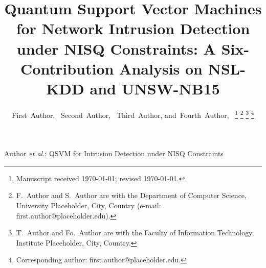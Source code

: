 \documentclass[journal]{IEEEtran}
\begin{document}
  \title{Quantum Support Vector Machines for Network Intrusion
    Detection under NISQ Constraints: A Six-Contribution Analysis
    on NSL-KDD and UNSW-NB15}

  \author{First~Author,~
          Second~Author,~
          Third~Author,
          and~Fourth~Author,~
  \thanks{Manuscript received \today; revised \today.}
  \thanks{F.~Author and S.~Author are with the Department of Computer
    Science, University Placeholder, City, Country (e-mail:
    first.author@placeholder.edu).}
  \thanks{T.~Author and Fo.~Author are with the Faculty of Information
    Technology, Institute Placeholder, City, Country.}
  \thanks{Corresponding author: first.author@placeholder.edu.}}

  {Author \MakeLowercase{\textit{et al.}}: QSVM for Intrusion Detection under NISQ Constraints}

  \maketitle
\end{document}
